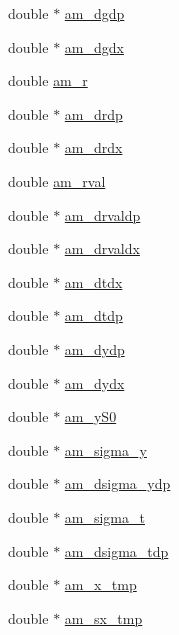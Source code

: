 \begin{DoxyCompactItemize}
\item 
double $\ast$ \hyperlink{struct_temp_data_a946de8c8ec9eaf3bae2c3cb5229e5608}{am\+\_\+dgdp}
\item 
double $\ast$ \hyperlink{struct_temp_data_a48ffc7d550f3a08efce20d54ebac8d6a}{am\+\_\+dgdx}
\item 
double \hyperlink{struct_temp_data_a7a652bd44d3d6f8ffa106a5295f5e2a1}{am\+\_\+r}
\item 
double $\ast$ \hyperlink{struct_temp_data_af40e5e8e0a65436934e4f2888340e458}{am\+\_\+drdp}
\item 
double $\ast$ \hyperlink{struct_temp_data_a0fb069ba24e8e90df621dd29ec4c84f7}{am\+\_\+drdx}
\item 
double \hyperlink{struct_temp_data_a64ffad68a060a30c8a0c665c65784dfc}{am\+\_\+rval}
\item 
double $\ast$ \hyperlink{struct_temp_data_aeb64dd8f56bebc4a6228eec5c4131aad}{am\+\_\+drvaldp}
\item 
double $\ast$ \hyperlink{struct_temp_data_acdc5967fa5a5aab617a1e41269f57935}{am\+\_\+drvaldx}
\item 
double $\ast$ \hyperlink{struct_temp_data_a5fea9eb6e03adbeb2e5c613f00078200}{am\+\_\+dtdx}
\item 
double $\ast$ \hyperlink{struct_temp_data_a270f8db43a6d39783954403593bdd584}{am\+\_\+dtdp}
\item 
double $\ast$ \hyperlink{struct_temp_data_a444afdf86ee9a2fa21a406665b8e680a}{am\+\_\+dydp}
\item 
double $\ast$ \hyperlink{struct_temp_data_a6ae1bc06c2372a7de4fc2195a7562fa6}{am\+\_\+dydx}
\item 
double $\ast$ \hyperlink{struct_temp_data_a3ddc8a88947f557500d6df4aeb09b18a}{am\+\_\+y\+S0}
\item 
double $\ast$ \hyperlink{struct_temp_data_aed7f1b33daffb581c6be404c0c5d12ac}{am\+\_\+sigma\+\_\+y}
\item 
double $\ast$ \hyperlink{struct_temp_data_a8ffa0cf50a6827ba6f5964625d049a30}{am\+\_\+dsigma\+\_\+ydp}
\item 
double $\ast$ \hyperlink{struct_temp_data_a6b326ec16453b4518b549856f913acbf}{am\+\_\+sigma\+\_\+t}
\item 
double $\ast$ \hyperlink{struct_temp_data_a70d1dd9123f113a231825d6d58c92550}{am\+\_\+dsigma\+\_\+tdp}
\item 
double $\ast$ \hyperlink{struct_temp_data_ab741ac82e5272750a751572dff03daf9}{am\+\_\+x\+\_\+tmp}
\item 
double $\ast$ \hyperlink{struct_temp_data_a36291523c0547b6a1086910461d13569}{am\+\_\+sx\+\_\+tmp}

\end{DoxyCompactItemize}
